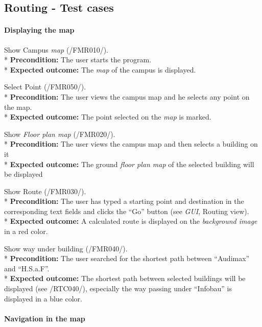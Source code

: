 \subsection{Routing - Test cases}

\paragraph{Displaying the map}
\begin{numerate}[RTC]
\item Show Campus \textit{map} (/FMR010/). \\*
	\textbf{Precondition:} The user starts the program. \\*
	\textbf{Expected outcome:} The \textit{map} of the campus is displayed.
\item Select Point (/FMR050/). \\*
	\textbf{Precondition:} The user views the campus map and he selects any point on the map. \\*
	\textbf{Expected outcome:} The point selected on the \textit{map} is marked.
\item Show \textit{Floor plan map} (/FMR020/). \\*
	 \textbf{Precondition:} The user views the campus map and then selects a building on it \\*
	 \textbf{Expected outcome:} The ground \textit{floor plan map} of the selected building will be displayed
\item Show Route (/FMR030/). \\*
	\textbf{Precondition:} The user has typed a starting point and destination in the corresponding text fields and clicks the ``Go'' button (see \textit{GUI}, Routing view). \\*
	\textbf{Expected outcome:} A calculated route is displayed on the \textit{background image} in a red color.
\item Show way under building (/FMR040/). \\*
	\textbf{Precondition:} The user searched for the shortest path between ``Audimax'' and ``H.S.a.F''. \\*
	\textbf{Expected outcome:} The shortest path between selected buildings will be displayed (see /RTC040/), especially the way passing under ``Infobau'' is displayed in a blue color.
\end{numerate}

\paragraph{Navigation in the map}


